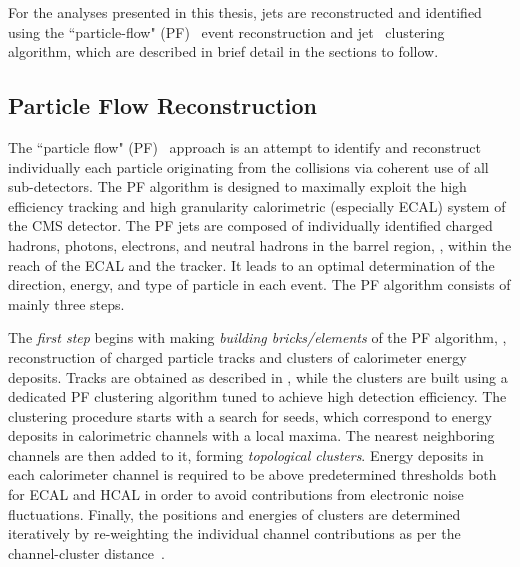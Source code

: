 For the analyses presented in this thesis, jets are reconstructed and identified using the ``particle-flow" (PF)~\cite{CMS-PAS-PFT-09-001} event
reconstruction and \antikt jet~\cite{Cacciari:2008gp} clustering algorithm, which are described in brief detail in the sections to follow. 

\subsection{Particle Flow Reconstruction}\label{Se:PFAlgo}
The ``particle flow" (PF)~\cite{CMS-PAS-PFT-09-001} approach is an attempt to identify and reconstruct individually each particle originating 
from the \pp collisions via coherent use of all sub-detectors. The PF algorithm is designed to maximally exploit the high efficiency tracking 
and high granularity calorimetric (especially ECAL) system of the CMS detector. The PF jets are composed of individually identified charged 
hadrons, photons, electrons, and neutral hadrons in the barrel region, \ie, within the reach of the ECAL and the tracker. It leads to an optimal 
determination of the direction, energy, and type of particle in each event. The PF algorithm consists of mainly three steps.

The \emph{first step} begins with making \emph{building bricks/elements} of the PF algorithm, \ie, reconstruction of charged particle tracks 
and clusters of calorimeter energy deposits. Tracks are obtained as described in \sectn{\ref{sec:trackReco}}, while the clusters are built using a
 dedicated PF clustering algorithm tuned to achieve high detection efficiency. The clustering procedure starts with a search for seeds, which 
correspond to energy deposits in calorimetric channels with a local maxima. The nearest neighboring channels are then added to it, forming 
\emph{topological clusters}. Energy deposits in each calorimeter channel is required to be above predetermined thresholds both for ECAL and HCAL
 in order to avoid contributions from electronic noise fluctuations. Finally, the positions and energies of clusters are determined iteratively 
by re-weighting the individual channel contributions as per the channel-cluster distance~\cite{CMS-PAS-PFT-10-003}.

